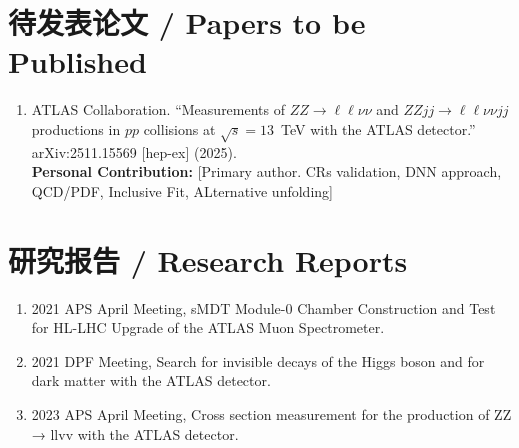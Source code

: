 \begin{publications}
\begin{enumerate}
\end{enumerate}

\section*{待发表论文 / Papers to be Published}

\begin{enumerate}
\item ATLAS Collaboration. ``Measurements of $ZZ \rightarrow \ell\ell\nu\nu$ and $ZZjj \rightarrow \ell\ell\nu\nu jj$ productions in $pp$ collisions at $\sqrt{s}=13$~TeV with the ATLAS detector.'' arXiv:2511.15569 [hep-ex] (2025). 
\\ \textbf{Personal Contribution:} [Primary author. CRs validation, DNN approach, QCD/PDF, Inclusive Fit, ALternative unfolding]
\end{enumerate}

\section*{研究报告 / Research Reports}
\begin{enumerate}
\item 2021 APS April Meeting, sMDT Module-0 Chamber Construction and Test for HL-LHC Upgrade of the ATLAS Muon Spectrometer. 
\item 2021 DPF Meeting, Search for invisible decays of the Higgs boson and for dark matter with the ATLAS detector. 
\item 2023 APS April Meeting, Cross section measurement for the production of ZZ → llvv with the ATLAS detector. 
\end{enumerate}

\end{publications}
